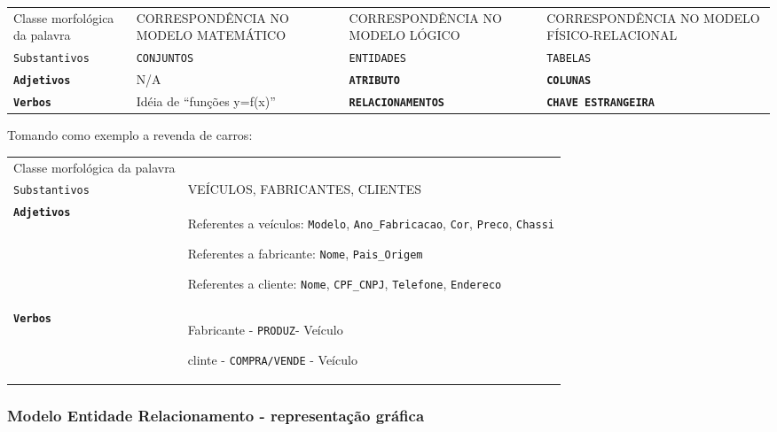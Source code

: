 \documentclass[
]{book}
\begin{document}
\begin{longtable}[]{@{}
  >{\raggedright\arraybackslash}p{}
  >{\raggedright\arraybackslash}p{}
  >{\raggedright\arraybackslash}p{}
  >{\raggedright\arraybackslash}p{}@{}}
\toprule\noalign{}
\endhead
\bottomrule\noalign{}
\endlastfoot
Classe morfológica da palavra & CORRESPONDÊNCIA NO MODELO MATEMÁTICO & CORRESPONDÊNCIA NO MODELO LÓGICO & CORRESPONDÊNCIA NO MODELO FÍSICO-RELACIONAL \\
\texttt{Substantivos} & \texttt{CONJUNTOS} & \texttt{ENTIDADES} & \texttt{TABELAS} \\
\textbf{\texttt{Adjetivos}} & N/A & \textbf{\texttt{ATRIBUTO}} & \textbf{\texttt{COLUNAS}} \\
\textbf{\texttt{Verbos}} & Idéia de ``funções y=f(x)'' & \textbf{\texttt{RELACIONAMENTOS}} & \textbf{\texttt{CHAVE\ ESTRANGEIRA}} \\
\end{longtable}

Tomando como exemplo a revenda de carros:

\begin{longtable}[]{@{}
  >{\raggedright\arraybackslash}p{}
  >{\raggedright\arraybackslash}p{}@{}}
\toprule\noalign{}
\endhead
\bottomrule\noalign{}
\endlastfoot
Classe morfológica da palavra & \\
\texttt{Substantivos} & VEÍCULOS, FABRICANTES, CLIENTES \\
\textbf{\texttt{Adjetivos}} & Referentes a veículos: \texttt{Modelo}, \texttt{Ano\_Fabricacao}, \texttt{Cor}, \texttt{Preco}, \texttt{Chassi}

Referentes a fabricante: \texttt{Nome}, \texttt{Pais\_Origem}

Referentes a cliente: \texttt{Nome}, \texttt{CPF\_CNPJ}, \texttt{Telefone}, \texttt{Endereco} \\
\textbf{\texttt{Verbos}} & Fabricante - \texttt{PRODUZ}- Veículo

clinte - \texttt{COMPRA/VENDE} - Veículo \\
\end{longtable}

\subsubsection{Modelo Entidade Relacionamento - representação gráfica}\label{modelo-entidade-relacionamento---representauxe7uxe3o-gruxe1fica}
\end{document}
